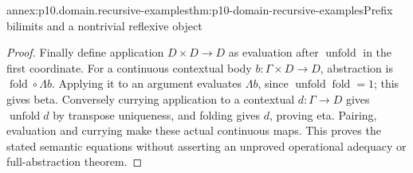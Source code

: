 \begin{annexitem}{annex:p10.domain.recursive-examples}{thm:p10-domain-recursive-examples}{Prefix bilimits and a nontrivial reflexive object}
\begin{proof}
Finally define application \(D\times D\to D\) as evaluation
after \(\operatorname{unfold}\) in the first coordinate.
For a continuous contextual body \(b:\Gamma\times D\to D\),
abstraction is \(\operatorname{fold}\circ\Lambda b\).
Applying it to an argument evaluates \(\Lambda b\), since
\(\operatorname{unfold}\operatorname{fold}=1\); this gives beta.
Conversely currying application to a contextual \(d:\Gamma\to D\)
gives \(\operatorname{unfold}d\) by transpose uniqueness, and
folding gives \(d\), proving eta. Pairing, evaluation and currying
make these actual continuous maps. This proves the stated semantic
equations without asserting an unproved operational adequacy or
full-abstraction theorem.
\end{proof}
\end{annexitem}
